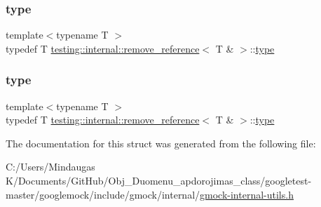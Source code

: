 \mbox{\label{structtesting_1_1internal_1_1remove__reference_3_01_t_01_6_01_4_a0d72f004f54016a47c752a82be352a19}} 
\subsubsection{\texorpdfstring{type}{type}\hspace{0.1cm}{\footnotesize\ttfamily [2/3]}}
{\footnotesize\ttfamily template$<$typename T $>$ \\
typedef T \mbox{\hyperlink{structtesting_1_1internal_1_1remove__reference}{testing\+::internal\+::remove\+\_\+reference}}$<$ T \& $>$\+::\mbox{\hyperlink{structtesting_1_1internal_1_1remove__reference_3_01_t_01_6_01_4_a0d72f004f54016a47c752a82be352a19}{type}}}

\mbox{\label{structtesting_1_1internal_1_1remove__reference_3_01_t_01_6_01_4_a0d72f004f54016a47c752a82be352a19}} 
\subsubsection{\texorpdfstring{type}{type}\hspace{0.1cm}{\footnotesize\ttfamily [3/3]}}
{\footnotesize\ttfamily template$<$typename T $>$ \\
typedef T \mbox{\hyperlink{structtesting_1_1internal_1_1remove__reference}{testing\+::internal\+::remove\+\_\+reference}}$<$ T \& $>$\+::\mbox{\hyperlink{structtesting_1_1internal_1_1remove__reference_3_01_t_01_6_01_4_a0d72f004f54016a47c752a82be352a19}{type}}}



The documentation for this struct was generated from the following file\+:\begin{DoxyCompactItemize}
\item 
C\+:/\+Users/\+Mindaugas K/\+Documents/\+Git\+Hub/\+Obj\+\_\+\+Duomenu\+\_\+apdorojimas\+\_\+class/googletest-\/master/googlemock/include/gmock/internal/\mbox{\hyperlink{googletest-master_2googlemock_2include_2gmock_2internal_2gmock-internal-utils_8h}{gmock-\/internal-\/utils.\+h}}\end{DoxyCompactItemize}
